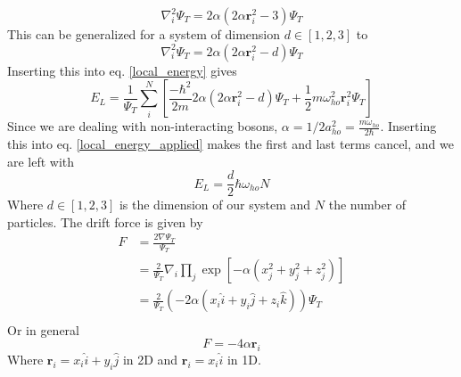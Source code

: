 \documentclass[
    a4paper, aps, twocolumn, floatfix, superscriptaddress,
    nofootinbib]{revtex4-1}
\begin{document}
\begin{appendices}
\begin{equation}
\nabla_i^2 \Psi_T = 2\alpha \left(2\alpha \boldsymbol{r}_i^2 -3\right) \Psi_T
\end{equation}
This can be generalized for a system of dimension $d\in [1,2,3]$ to
\begin{equation}
\nabla_i^2 \Psi_T = 2\alpha \left(2\alpha \boldsymbol{r}_i^2 -d\right) \Psi_T
\end{equation}
Inserting this into eq. \eqref{local_energy} gives 
\begin{equation}\label{local_energy_applied}
    E_L = \frac{1}{\Psi_T} \sum_i^N \left[\frac{-\hbar^2}{2m} 2\alpha(2\alpha \boldsymbol{r}_i^2 - d) \Psi_T + \frac{1}{2}m \omega_{ho}^2 \boldsymbol{r}_i^2 \Psi_T\right]
\end{equation}
Since we are dealing with non-interacting bosons, $\alpha = 1/2 a_{ho}^2 = \frac{m\omega_{ho}}{2\hbar}$. Inserting this into eq. \eqref{local_energy_applied} makes the first and last terms cancel, and we are left with
\begin{equation}
    E_L = \frac{d}{2} \hbar \omega_{ho} N
\end{equation}
Where $d\in [1,2,3]$ is the dimension of our system and $N$ the number of particles. 
The drift force is given by 
\begin{align}
    F &= \frac{2\nabla \Psi_T}{\Psi_T}\\
    &= \frac{2}{\Psi_T}\nabla_i\prod_j \exp[-\alpha(x_j^2+y_j^2+z_j^2)] \\ 
    &= \frac{2}{\Psi_T} \left(-2\alpha (x_i \hat{i}+ y_i \hat{j} + z_i \hat{k})\right) \Psi_T \\
\end{align}
Or in general 
\begin{equation}
    F =-4\alpha \boldsymbol{r}_i
\end{equation}
Where $\boldsymbol{r}_i = x_i \hat{i} + y_i \hat{j}$ in 2D and $\boldsymbol{r}_i = x_i \hat{i}$ in 1D.

\end{appendices}
\end{document}
